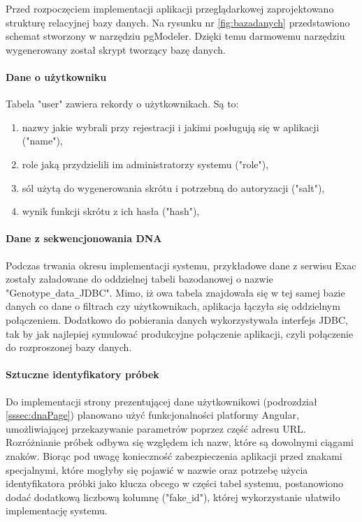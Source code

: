 \documentclass[a4paper,12pt,twoside]{article}
\begin{document}
Przed rozpoczęciem implementacji aplikacji przeglądarkowej zaprojektowano strukturę 
relacyjnej bazy danych. Na rysunku nr \ref{fig:bazadanych} przedstawiono schemat stworzony
w narzędziu pgModeler\cite{pgModeler}. Dzięki temu darmowemu narzędziu wygenerowany został
skrypt tworzący bazę danych.  

\paragraph{Dane o użytkowniku} Tabela "user" zawiera rekordy o użytkownikach. 
Są to:
\begin{enumerate}[1)]
\item nazwy jakie wybrali przy rejestracji i jakimi posługują się w aplikacji ("name"),
\item role jaką przydzielili im administratorzy systemu ("role"),
\item sól użytą do wygenerowania skrótu i potrzebną do autoryzacji ("salt"),
\item wynik funkcji skrótu z ich hasła ("hash"),
\end{enumerate}

\paragraph{Dane z sekwencjonowania DNA} Podczas trwania okresu implementacji systemu,
przykładowe dane z serwisu Exac zostały załadowane do oddzielnej tabeli bazodanowej o nazwie "Genotype\verb!_!data\verb!_!JDBC". Mimo, iż owa tabela znajdowała się w tej samej bazie danych co 
dane o filtrach czy użytkownikach, aplikacja łączyła się oddzielnym połączeniem. 
Dodatkowo do pobierania danych wykorzystywała interfejs JDBC, tak by jak najlepiej
symulować produkcyjne połączenie aplikacji, czyli połączenie do rozproszonej bazy danych.

\paragraph{Sztuczne identyfikatory próbek} Do implementacji strony
prezentującej dane użytkownikowi (podrozdział \ref{sssec:dnaPage}) planowano użyć 
funkcjonalności platformy Angular, umożliwiającej przekazywanie parametrów 
poprzez część adresu URL. Rozróżnianie próbek odbywa się względem ich nazw, które
są dowolnymi ciągami znaków. Biorąc pod uwagę konieczność zabezpieczenia aplikacji przed 
znakami specjalnymi, które mogłyby się pojawić w nazwie oraz potrzebę
użycia identyfikatora próbki jako klucza obcego w części tabel systemu, postanowiono
dodać dodatkową liczbową kolumnę ("fake\verb!_!id"), której wykorzystanie ułatwiło implementację systemu.
\end{document}
